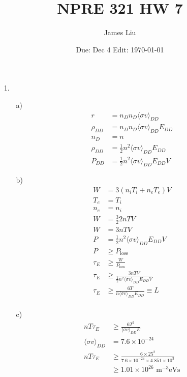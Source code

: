 \documentclass{article}
\date{Due: Dec 4 Edit: \today}
\title{NPRE 321 HW 7}
\author{James Liu}
\begin{document}
\maketitle
\begin{itemize}
    \item [1.]
    \begin{itemize}
        \item [a)]
        \begin{align*}
            r&=n_Dn_D\langle\sigma v \rangle_{DD}\\
            \rho_{DD}&=n_Dn_D\langle\sigma v \rangle_{DD}E_{DD}\\
            n_D&=n\\
            \rho_{DD}&=\frac{1}{2}n^2\langle\sigma v \rangle_{DD}E_{DD}\\
            P_{DD}&=\frac{1}{2}n^2\langle\sigma v \rangle_{DD}E_{DD} V
        \end{align*}
        \item [b)]
        \begin{align*}
            W&=3(n_iT_i+n_eT_e)V\\
            T_e&=T_i\\
            n_e&=n_i\\
            W&=\frac{3}{2}2nTV\\
            W&=3nTV\\
            P&=\frac{1}{2}n^2\langle\sigma v \rangle_{DD}E_{DD} V\\
            P&\geq P_{\text{loss}}\\
            \tau_E&\geq\frac{W}{P_{\text{loss}}}\\
            \tau_E&\geq\frac{3nTV}{\frac{1}{2}n^2\langle\sigma v \rangle_{DD}E_{DD} V}\\
            \tau_E&\geq\frac{6T}{n\langle\sigma v \rangle_{DD}E_{DD}}\equiv L\\
        \end{align*}
        \item [c)]
        \begin{align*}
            nT\tau_E&\geqslant\frac{6T^2}{\langle\sigma v \rangle_{DD}E}\\
            \langle\sigma v \rangle_{DD}&=7.6\times 10^{-24}\\
            nT\tau_E&\geqslant\frac{6\times 25^2}{7.6\times 10^{-24}\times 4.851\times 10^3}\\
            &\geqslant1.01\times 10^{26}\text{ m}^{-3}\text{eVs}
        \end{align*}

\end{itemize}
\end{itemize}
\end{document}
